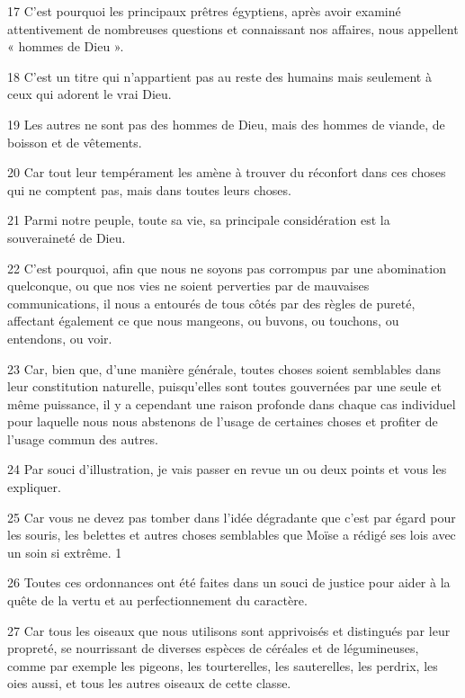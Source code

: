 \par 17 C'est pourquoi les principaux prêtres égyptiens, après avoir examiné attentivement de nombreuses questions et connaissant nos affaires, nous appellent « hommes de Dieu ».

\par 18 C'est un titre qui n'appartient pas au reste des humains mais seulement à ceux qui adorent le vrai Dieu.

\par 19 Les autres ne sont pas des hommes de Dieu, mais des hommes de viande, de boisson et de vêtements.

\par 20 Car tout leur tempérament les amène à trouver du réconfort dans ces choses qui ne comptent pas, mais dans toutes leurs choses.

\par 21 Parmi notre peuple, toute sa vie, sa principale considération est la souveraineté de Dieu.

\par 22 C'est pourquoi, afin que nous ne soyons pas corrompus par une abomination quelconque, ou que nos vies ne soient perverties par de mauvaises communications, il nous a entourés de tous côtés par des règles de pureté, affectant également ce que nous mangeons, ou buvons, ou touchons, ou entendons, ou voir.

\par 23 Car, bien que, d'une manière générale, toutes choses soient semblables dans leur constitution naturelle, puisqu'elles sont toutes gouvernées par une seule et même puissance, il y a cependant une raison profonde dans chaque cas individuel pour laquelle nous nous abstenons de l'usage de certaines choses et profiter de l’usage commun des autres.

\par 24 Par souci d'illustration, je vais passer en revue un ou deux points et vous les expliquer.

\par 25 Car vous ne devez pas tomber dans l'idée dégradante que c'est par égard pour les souris, les belettes et autres choses semblables que Moïse a rédigé ses lois avec un soin si extrême. 1

\par 26 Toutes ces ordonnances ont été faites dans un souci de justice pour aider à la quête de la vertu et au perfectionnement du caractère.

\par 27 Car tous les oiseaux que nous utilisons sont apprivoisés et distingués par leur propreté, se nourrissant de diverses espèces de céréales et de légumineuses, comme par exemple les pigeons, les tourterelles, les sauterelles, les perdrix, les oies aussi, et tous les autres oiseaux de cette classe.

